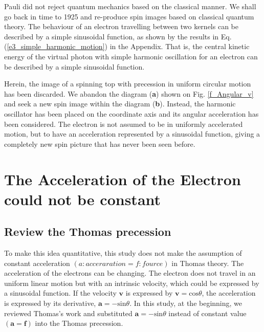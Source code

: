 \documentclass[10.5pt]{article}
\numberwithin{equation}{section}
\begin{document}
Pauli did not reject quantum mechanics based on the classical manner. We shall go back in time to 1925 and re-produce spin images based on classical quantum theory. The behaviour of an electron travelling between two kernels can be described by a simple sinusoidal function, as shown by the results in Eq. (\ref{e3_simple_harmonic_motion}) in the Appendix. That is, the central kinetic energy of the virtual photon with simple harmonic oscillation for an electron can be described by a simple sinusoidal function.

Herein, the image of a spinning top with precession in uniform circular motion has been discarded. We abandon the diagram ({\bf a}) shown on Fig. \ref{f_Angular_v} and seek a new spin image within the diagram ({\bf b}). Instead, the harmonic oscillator has been placed on the coordinate axis and its angular acceleration has been considered. The electron is not assumed to be in uniformly accelerated motion, but to have an acceleration represented by a sinusoidal function, giving a completely new spin picture that has never been seen before.


\section{The Acceleration of the Electron could not be constant}

\subsection{Review the Thomas precession}


To make this idea quantitative, this study does not make the assumption of constant acceleration $(a: acceraration = f: fource)$ in Thomas theory. The acceleration of the electrons can be changing. The electron does not travel in an uniform linear motion but with an intrinsic velocity, which could be expressed by a sinusoidal function. If the velocity ${\boldsymbol v}$ is expressed by ${\boldsymbol v} = \mathrm{cos}\theta$, the acceleration is expressed by its derivative, ${\boldsymbol a} = - \mathrm{sin}\theta$. In this study, at the beginning, we reviewed Thomas's work and substituted ${\boldsymbol a} = -\mathrm{sin}\theta$ instead of constant value $({\boldsymbol a} = {\boldsymbol f})$ into the Thomas precession. 
\end{document}
